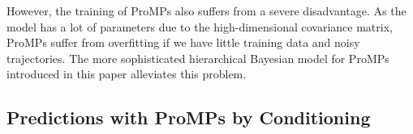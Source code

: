 However, the training of ProMPs also suffers from a severe disadvantage. As the model has a lot of parameters due
to the high-dimensional covariance matrix, ProMPs suffer from overfitting if we have little training data and noisy trajectories. 
The more sophisticated hierarchical Bayesian model for ProMPs introduced in this paper alleviates this problem. 






\subsection{Predictions with ProMPs by Conditioning}

